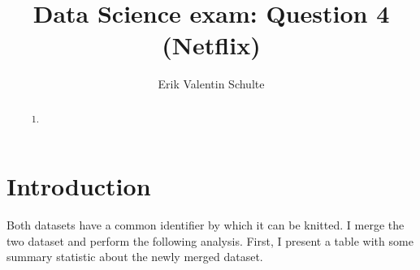 \documentclass[11pt,preprint, authoryear]{elsarticle}
\numberwithin{equation}{section}
\numberwithin{figure}{section}
\numberwithin{table}{section}
\def\tightlist{} %
\begin{document}
\begin{frontmatter}  %

\title{Data Science exam: Question 4 (Netflix)}





\author[Add1]{Erik Valentin Schulte}





\address[Add1]{Stellenbosch University, South Africa}


\begin{abstract}
\small{
\begin{enumerate}
\def\labelenumi{\alph{enumi}.}
\setcounter{enumi}{23}
\tightlist
\item
\end{enumerate}
}
\end{abstract}

\vspace{1cm}





\vspace{0.5cm}

\end{frontmatter}



\pagestyle{fancy}
\chead{}
\rhead{}
\lfoot{}
\lhead{}
\cfoot{}


\headsep 35pt %




\hypertarget{introduction}{%
\section{\texorpdfstring{Introduction
\label{Introduction}}{Introduction }}\label{introduction}}

Both datasets have a common identifier by which it can be knitted. I
merge the two dataset and perform the following analysis. First, I
present a table with some summary statistic about the newly merged
dataset.
\end{document}
